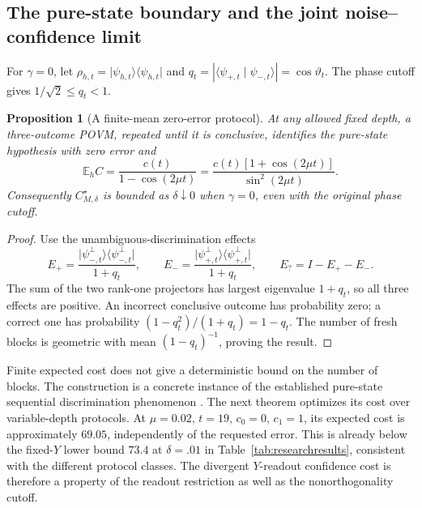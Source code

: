 \documentclass[11pt,a4paper]{article}
\newcommand{\ket}[1]{\lvert #1\rangle}
\newcommand{\bra}[1]{\langle #1\rvert}
\newcommand{\braket}[2]{\langle #1\mid #2\rangle}
\newcommand{\E}{\mathbb E}
\newtheorem{proposition}[theorem]{Proposition}
\theoremstyle{definition}
\theoremstyle{remark}
\numberwithin{equation}{section}
\begin{document}
\subsection{The pure-state boundary and the joint noise--confidence limit}
For $\gamma=0$, let $\rho_{h,t}=\ket{\psi_{h,t}}\bra{\psi_{h,t}}$ and
$q_t=|\braket{\psi_{+,t}}{\psi_{-,t}}|=\cos\vartheta_t$.
The phase cutoff gives $1/\sqrt2\leq q_t<1$.

\begin{proposition}[A finite-mean zero-error protocol]\label{prop:usd}
At any allowed fixed depth, a three-outcome POVM, repeated until it is
conclusive, identifies the pure-state hypothesis with zero error and
\begin{equation}\label{eq:usd-cost}
 \E_h C=\frac{c(t)}{1-\cos(2\mu t)}
       =\frac{c(t)[1+\cos(2\mu t)]}{\sin^2(2\mu t)}.
\end{equation}
Consequently $C_{M,\delta}^\star$ is bounded as $\delta\downarrow 0$ when
$\gamma=0$, even with the original phase cutoff.
\end{proposition}
\begin{proof}
Use the unambiguous-discrimination effects
\[
 E_+=\frac{\ket{\psi_{-,t}^{\perp}}\bra{\psi_{-,t}^{\perp}}}{1+q_t},
 \qquad
 E_-=\frac{\ket{\psi_{+,t}^{\perp}}\bra{\psi_{+,t}^{\perp}}}{1+q_t},
 \qquad E_?=I-E_+-E_-.
\]
The sum of the two rank-one projectors has largest eigenvalue $1+q_t$,
so all three effects are positive. An incorrect conclusive outcome has
probability zero; a correct one has probability
$(1-q_t^2)/(1+q_t)=1-q_t$. The number of fresh blocks is geometric with
mean $(1-q_t)^{-1}$, proving the result.
\end{proof}

Finite expected cost does not give a deterministic bound on the number
of blocks. The construction is a concrete instance of the established
pure-state sequential discrimination phenomenon \citep{vargas2021}.
The next theorem optimizes its cost over variable-depth protocols. At $\mu=0.02$, $t=19$, $c_0=0$, $c_1=1$, its expected
cost is approximately $69.05$, independently of the requested error.
This is already below the fixed-$Y$ lower bound $73.4$ at $\delta=.01$
in Table~\ref{tab:researchresults}, consistent with the different protocol classes.
The divergent $Y$-readout confidence cost is therefore a property of
the readout restriction as well as the nonorthogonality cutoff.
\end{document}
